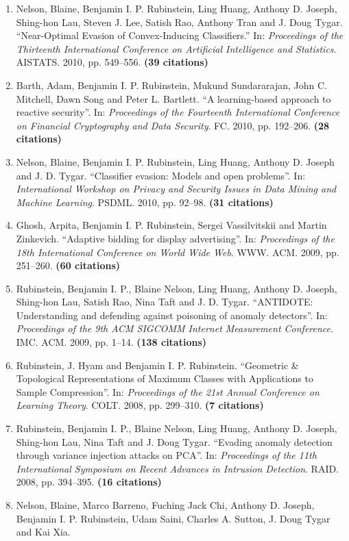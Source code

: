 \documentclass[a4paper,12pt]{article}
\begin{document}
\begin{enumerate}
\item Nelson, Blaine, Benjamin I. P. Rubinstein, Ling Huang, Anthony D. Joseph, Shing-hon Lau, Steven J. Lee, Satish Rao, Anthony Tran and J. Doug Tygar.
``Near-Optimal Evasion of Convex-Inducing Classifiers.''
In: 
\emph{Proceedings of the Thirteenth International Conference on Artificial Intelligence and Statistics}.
AISTATS.
2010, pp. 549--556.
 \textbf{(39 citations)}
\item Barth, Adam, Benjamin I. P. Rubinstein, Mukund Sundararajan, John C. Mitchell, Dawn Song and Peter L. Bartlett.
``A learning-based approach to reactive security''.
In: 
\emph{Proceedings of the Fourteenth International Conference on Financial Cryptography and Data Security}.
FC.
2010, pp. 192--206.
 \textbf{(28 citations)}
\item Nelson, Blaine, Benjamin I. P. Rubinstein, Ling Huang, Anthony D. Joseph and J. D. Tygar.
``Classifier evasion: Models and open problems''.
In: 
\emph{International Workshop on Privacy and Security Issues in Data Mining and Machine Learning}.
PSDML.
2010, pp. 92--98.
 \textbf{(31 citations)}
\item Ghosh, Arpita, Benjamin I. P. Rubinstein, Sergei Vassilvitskii and Martin Zinkevich.
``Adaptive bidding for display advertising''.
In: 
\emph{Proceedings of the 18th International Conference on World Wide Web}.
WWW.
ACM.
2009, pp. 251--260.
 \textbf{(60 citations)}
\item Rubinstein, Benjamin I. P., Blaine Nelson, Ling Huang, Anthony D. Joseph, Shing-hon Lau, Satish Rao, Nina Taft and J. D. Tygar.
``ANTIDOTE: Understanding and defending against poisoning of anomaly detectors''.
In: 
\emph{Proceedings of the 9th ACM SIGCOMM Internet Measurement Conference}.
IMC.
ACM.
2009, pp. 1--14.
 \textbf{(138 citations)}
\item Rubinstein, J. Hyam and Benjamin I. P. Rubinstein.
``Geometric \& Topological Representations of Maximum Classes with Applications to Sample Compression''.
In: 
\emph{Proceedings of the 21st Annual Conference on Learning Theory}.
COLT.
2008, pp. 299--310.
 \textbf{(7 citations)}
\item Rubinstein, Benjamin I. P., Blaine Nelson, Ling Huang, Anthony D. Joseph, Shing-hon Lau, Nina Taft and J. Doug Tygar.
``Evading anomaly detection through variance injection attacks on PCA''.
In: 
\emph{Proceedings of the 11th International Symposium on Recent Advances in Intrusion Detection}.
RAID.
2008, pp. 394--395.
 \textbf{(16 citations)}
\item Nelson, Blaine, Marco Barreno, Fuching Jack Chi, Anthony D. Joseph, Benjamin I. P. Rubinstein, Udam Saini, Charles A. Sutton, J. Doug Tygar and Kai Xia.

\end{enumerate}
\end{document}
